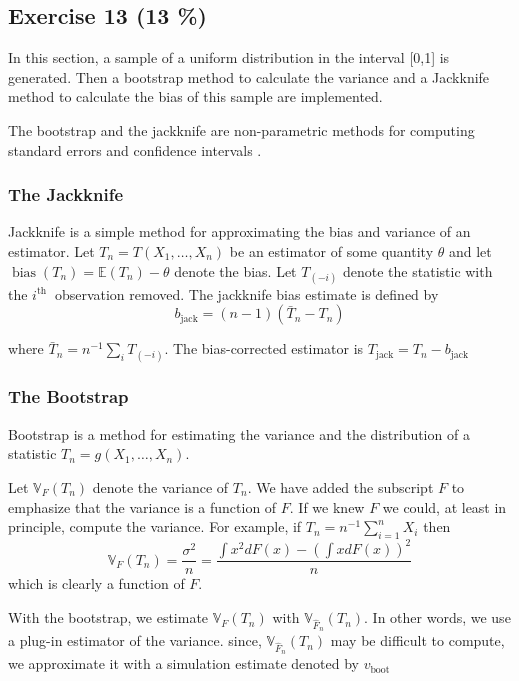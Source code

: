 \documentclass[11pt]{article}
\theoremstyle{definition}
\theoremstyle{remark}
\theoremstyle{remark}
\begin{document}
 \subsection*{Exercise 13 (13 \%)}
 In this section, a sample of a uniform distribution in the interval
 [0,1] is generated. Then a bootstrap method to calculate the variance
 and a Jackknife method to calculate the bias of this sample are
 implemented.

The bootstrap and the jackknife are non-parametric methods for
computing standard errors and confidence intervals
\cite{rodgers1999bootstrap}.

\subsubsection*{The Jackknife}

Jackknife is a simple method for approximating the bias and variance
of an estimator. Let $T_{n}=T\left(X_{1}, \ldots, X_{n}\right)$ be an
estimator of some quantity $\theta$ and let
$\operatorname{bias}\left(T_{n}\right)=\mathbb{E}\left(T_{n}\right)-\theta$
denote the bias. Let $T_{(-i)}$ denote the statistic with the
$i^{\text {th }}$ observation removed. The jackknife bias estimate is
defined by
\[
  b_{\mathrm{jack}}=(n-1)\left(\bar{T}_{n}-T_{n}\right)
\]

where $\bar{T}_{n}=n^{-1} \sum_{i} T_{(-i)}$. The bias-corrected
estimator is $T_{\mathrm{jack}}=T_{n}-b_{\mathrm{jack}}$

\subsubsection*{The Bootstrap}

Bootstrap is a method for estimating the variance and the distribution
of a statistic $T_{n}=g\left(X_{1}, \ldots, X_{n}\right) .$

Let $\mathbb{V}_{F}\left(T_{n}\right)$ denote the variance of
$T_{n} .$ We have added the subscript $F$ to emphasize that the
variance is a function of $F$. If we knew $F$ we could, at least in
principle, compute the variance. For example, if
$T_{n}=n^{-1} \sum_{i=1}^{n} X_{i}$ then
\[
  \mathbb{V}_{F}\left(T_{n}\right)=\frac{\sigma^{2}}{n}=\frac{\int
    x^{2} d F(x)-\left(\int x d F(x)\right)^{2}}{n}
\]
which is clearly a function of $F$.

With the bootstrap, we estimate $\mathbb{V}_{F}\left(T_{n}\right)$
with $\mathbb{V}_{\widehat{F}_{n}}\left(T_{n}\right)$. In other words,
we use a plug-in estimator of the variance. since,
$\mathbb{V}_{\widehat{F}_{n}}\left(T_{n}\right)$ may be difficult to
compute, we approximate it with a simulation estimate denoted by
$v_{\text {boot }}$
\\
\end{document}
